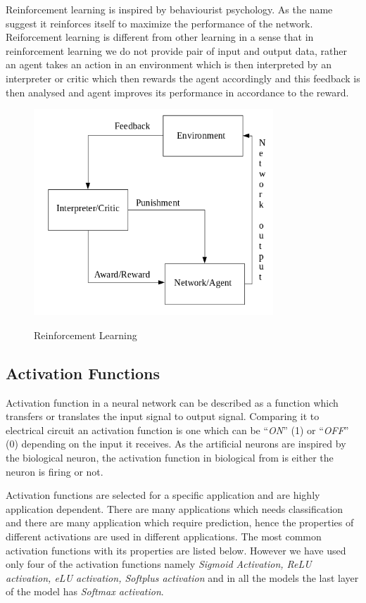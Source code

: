 \documentclass[12pt, a4paper]{report}
\begin{document}
Reinforcement learning is inspired by behaviourist psychology. As the name suggest it reinforces itself to maximize the performance of the network. Reiforcement learning is different from other learning in a sense that in reinforcement learning we do not provide pair of input and output data, rather an agent takes an action in an environment which is then interpreted by an interpreter or critic which then rewards the agent accordingly and this feedback is then analysed and agent improves its performance in accordance to the reward.\\ \par

\begin{figure}[h]
\centering	
\includegraphics[width=9cm]{reinforcement.png}\\
\caption{Reinforcement Learning}
\label{fig:reinforcement}
\end{figure} 

\clearpage

\subsection{Activation Functions}\label{activationfunction}
Activation function in a neural network can be described as a function which transfers or translates the input signal to output signal. Comparing it to electrical circuit an activation function is one which can be ``\textit{ON}'' (1) or ``\textit{OFF}'' (0) depending on the input it receives. As the artificial neurons are inspired by the biological neuron, the activation function in biological from is either the neuron is firing or not.\\ \par

Activation functions are selected for a specific application and are highly application dependent. There are many applications which needs classification and there are many application which require prediction, hence the properties of different activations are used in different applications. The most common activation functions with its properties are listed below. However we have used only four of the activation functions namely \textit{Sigmoid Activation, ReLU activation, eLU activation, Softplus activation} and in all the models the last layer of the model has \textit{Softmax activation}.\\ \par
\end{document}
